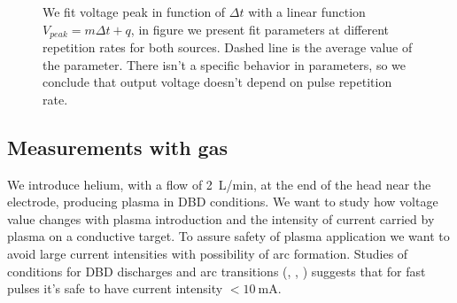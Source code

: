 \begin{figure}
 \centering
 \hfill
 \caption{We fit voltage peak in function of $\Delta t$ with a linear function $V_{peak} = m \Delta t + q$, in figure we present fit parameters at different repetition rates for both sources. Dashed line is the average value of the parameter. There isn't a specific behavior in parameters, so we conclude that output voltage doesn't depend on pulse repetition rate.}
 \label{fig:linnogas}
\end{figure}


\subsection{Measurements with gas}
We introduce helium, with a flow of \SI{2}{\liter/\minute}, at the end of the head near the electrode, producing plasma in DBD conditions. We want to study how voltage value changes with plasma introduction and the intensity of current carried by plasma on a conductive target. To assure safety of plasma application we want to avoid large current intensities with possibility of arc formation. Studies of conditions for DBD discharges and arc transitions (\cite{kogelschatz:jpa-00255561}, \cite{TOMAI2006409}, \cite{PhysRev.34.876}) suggests that for fast pulses it's safe to have current intensity $< \SI{10}{\milli\ampere}$.

